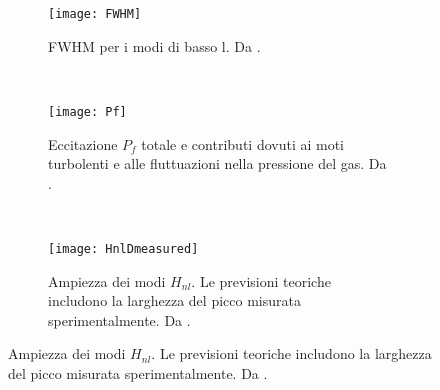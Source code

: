 \documentclass[../main.tex]{subfiles}
\begin{document}
\begin{figure}[!ht]

\begin{subfigure}{0.31\textwidth}
\centering
\texttt{[image: FWHM]}
\caption{FWHM per i modi di basso l. Da \cite{houdek2006stochastic}.}\label{fig:FWHMbison}
\end{subfigure}
~
\begin{subfigure}{0.31\textwidth}
\centering
\texttt{[image: Pf]}
\caption{Eccitazione $P_f$ totale e contributi dovuti ai moti turbolenti e alle fluttuazioni nella pressione del gas. Da \cite{houdek2006stochastic}.}\label{fig:Pf}
\end{subfigure}
~
\begin{subfigure}{0.31\textwidth}
\centering
\texttt{[image: HnlDmeasured]}
\caption{Ampiezza dei modi $H_{nl}$. Le previsioni teoriche includono la larghezza del picco misurata sperimentalmente. Da \cite{houdek2006stochastic}.}\label{fig:peakDmeasured}
\end{subfigure}

\end{figure}

\end{document}
